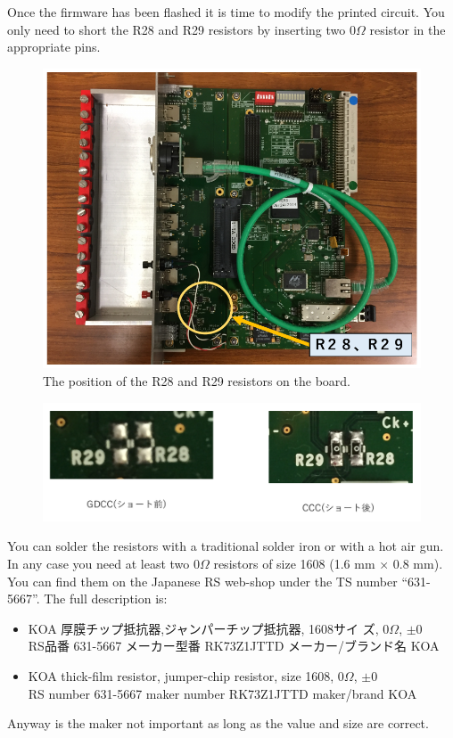 Once the firmware has been flashed it is time to modify the printed circuit. You
only need to short the R28 and R29 resistors by inserting two $0\Omega$ resistor
in the appropriate pins.
\begin{figure}[ht]
  \centering \includegraphics[width=0.5\linewidth,frame]{GDCC-CCC1}
  \caption{The position of the R28 and R29 resistors on the board.}
\end{figure}
\begin{figure}[ht]
  \centering \includegraphics[width=0.8\linewidth]{GDCC-CCC2}
\end{figure}
You can solder the resistors with a traditional solder iron or with a hot air
gun. In any case you need at least two $0\Omega$ resistors of size 1608 (1.6 mm
× 0.8 mm). You can find them on the Japanese RS web-shop under the TS number
``631-5667''. The full description is:
\begin{itemize}
\item \begin{CJK}{UTF8}{min}KOA 厚膜チップ抵抗器,ジャンパーチップ抵抗器, 1608サイ
    ズ, $0\Omega$, $\pm
    0$ \\
    RS品番 631-5667 メーカー型番 RK73Z1JTTD メーカー/ブランド名 KOA\end{CJK}
\item KOA thick-film resistor, jumper-chip resistor, size 1608, $0\Omega$, $\pm
  0$ \\
  RS number 631-5667 maker number RK73Z1JTTD maker/brand KOA
\end{itemize}
Anyway is the maker not important as long as the value and size are correct.

